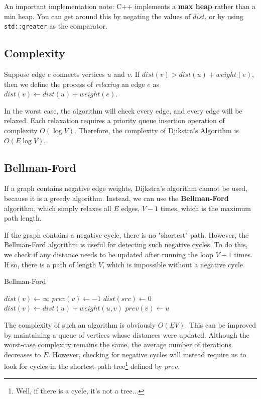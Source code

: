 An important implementation note: C++ implements a \textbf{max heap} rather than a min heap. You can get around this by negating the values of $dist$, or by using \verb|std::greater| as the comparator.


\subsection{Complexity}

Suppose edge $e$ connects vertices $u$ and $v$. If $dist(v) > dist(u) + weight(e)$, then we define the process of \textit{relaxing} an edge $e$ as $dist(v) \gets dist(u) + weight(e)$.

In the worst case, the algorithm will check every edge, and every edge will be relaxed. Each relaxation requires a priority queue insertion operation of complexity $O(\log V)$. Therefore, the complexity of Djikstra's Algorithm is $O(E \log V)$.

\subsection{Bellman-Ford}
If a graph contains negative edge weights, Dijkstra's algorithm cannot be used, because it is a greedy algorithm. Instead, we can use the \textbf{Bellman-Ford} algorithm, which simply relaxes all $E$ edges, $V-1$ times, which is the maximum path length.

If the graph contains a negative cycle, there is no "shortest" path. However, the Bellman-Ford algorithm is useful for detecting such negative cycles. To do this, we check if any distance needs to be updated after running the loop $V-1$ times. If so, there is a path of length $V$, which is impossible without a negative cycle.

\begin{algorithm}[H]
\caption{Bellman-Ford}
\begin{algorithmic}
	\State $dist(v) \gets \infty$
    \State $prev(v) \gets -1$
\EndFor
\State $dist(src) \gets 0$
    	    \State $dist(v) \gets dist(u)+weight(u,v)$
	        \State $prev(v) \gets u$
        \EndIf
	\EndFor
\EndFor
{}
	\EndIf
\EndFor
\end{algorithmic}
\end{algorithm}

The complexity of such an algorithm is obviously $O(E V)$. This can be improved by maintaining a queue of vertices whose distances were updated. Although the worst-case complexity remains the same, the average number of iterations decreases to $E$. However, checking for negative cycles will instead require us to look for cycles in the shortest-path tree\footnote{Well, if there is a cycle, it's not a tree...} defined by $prev$.


